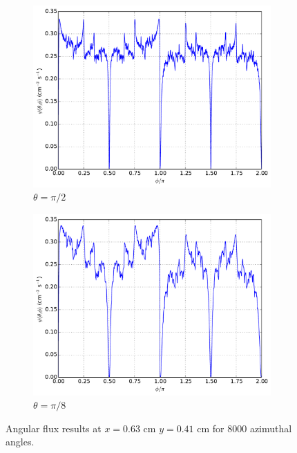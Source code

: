 \documentclass[12pt]{article}
\newenvironment{solution}[1][Solution]{\begin{trivlist}
\item[\hskip \labelsep {\bfseries #1} {\hspace{-0.2em}\bfseries:}]\hspace{0.3in}\newline}{\end{trivlist}}
\begin{document}
\begin{solution}
\begin{figure}
\begin{subfigure}{0.5\textwidth}
\centering
\includegraphics[width=1.0\textwidth]{r4163pi2.pdf}
\caption{$\theta=\pi/2$}
    \end{subfigure}
    \begin{subfigure}{0.5\textwidth}
\centering
\includegraphics[width=1.0\textwidth]{r4163pi8.pdf}
\caption{$\theta=\pi/8$}
    \end{subfigure}
    \caption{Angular flux results at $x=0.63$ cm $y=0.41$ cm for 8000 azimuthal angles.}
\end{figure}
\begin{figure}
    \begin{subfigure}{0.5\textwidth}
\centering

\end{subfigure}
\end{figure}
\end{solution}
\end{document}
